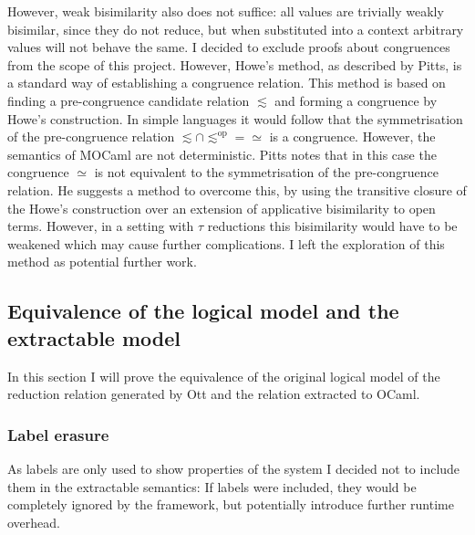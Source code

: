 \documentclass[12pt,twoside,notitlepage]{report}
\theoremstyle{plain}%
\theoremstyle{definition}
\theoremstyle{remark}
\begin{document}
However, weak bisimilarity also does not suffice: all values are trivially weakly bisimilar, since they do not reduce, but when substituted into a context arbitrary values will not behave the same. I decided to exclude proofs about congruences from the scope of this project. However, Howe's method\cite{howe1996proving}, as described by Pitts\cite{pitts2011howe}, is a standard way of establishing a congruence relation. This method is based on finding a pre-congruence candidate relation $ \lesssim $ and forming a congruence by Howe's construction. In simple languages it would follow that the symmetrisation of the pre-congruence relation  $ \lesssim \cap \lesssim^{\text{op}} = \simeq $ is a congruence. However, the semantics of MOCaml are not deterministic. Pitts notes that in this case the congruence $  \simeq$ is not equivalent to the symmetrisation of the pre-congruence relation. He suggests a method to overcome this, by using the transitive closure of the Howe's construction over an extension of applicative bisimilarity to open terms. However, in a setting with $ \tau $ reductions this bisimilarity would have to be weakened which may cause further complications. I left the exploration of this method as potential further work.



\subsection{Equivalence of the logical model and the extractable model}
In this section I will prove the equivalence of the original logical model of the reduction relation generated by Ott and the relation extracted to OCaml.
\subsubsection{Label erasure}
As labels are only used to show properties of the system I decided not to include them in the extractable semantics: If labels were included, they would be completely ignored by the framework, but potentially introduce further runtime overhead.
\end{document}
